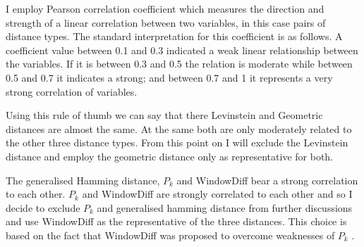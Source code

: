     \begin{table}[!ht]
    \centering
    \caption{Pearson correlation coefficients for pairs of distance measure types}
    \label{tab:correlation-matrix-distances}
    \end{table}
    
    I employ Pearson correlation coefficient which measures the direction and strength of a linear correlation between two variables, in this case pairs of distance types. The standard interpretation for this coefficient is as follows. A coefficient value between 0.1 and 0.3 indicated a weak linear relationship between the variables. If it is between 0.3 and 0.5 the relation is moderate while between 0.5 and 0.7 it indicates a strong; and between 0.7 and 1 it represents a very strong correlation of variables. 
    
    Using this rule of thumb we can say that there Levinstein and Geometric distances are almost the same. At the same both are only moderately related to the other three distance types. From this point on I will exclude the Levinstein distance and employ the geometric distance only as representative for both. 
    
    The generalised Hamming distance, $P_k$ and WindowDiff bear a strong correlation to each other. $P_k$ and WindowDiff are strongly correlated to each other and so I decide to exclude $P_k$ and generalised hamming distance from further discussions and use WindowDiff as the representative of the three distances. This choice is based on the fact that WindowDiff was proposed to overcome weaknesses of $P_k$ \citep[10]{pevzner2002critique}.
    
